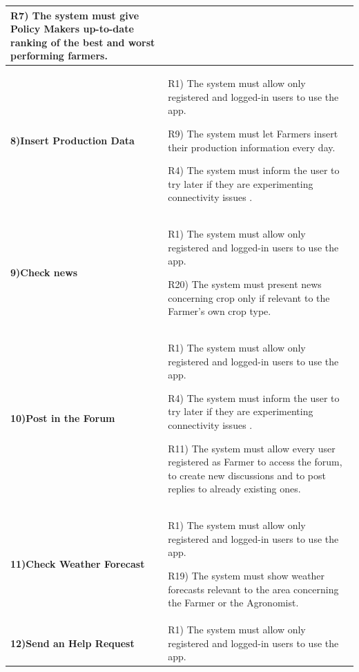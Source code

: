 \documentclass[table, 12pt]{article}
\begin{document}
\begin{itemize}
\begin{longtable}{|p{}|p{}|}
                                                                                           R7) The system must give Policy Makers up-to-date ranking of the best and worst performing farmers.\\\hline
                                
                    \cellcolor{SpringGreen!50}\textbf{8)Insert Production Data}\centering & R1) The system must allow only registered and logged-in users to use the app.

                                                                                  R9) The system must let Farmers insert their production information every day.
                                                                                  
                                                                                  R4) The system must inform the user to try later if they are experimenting connectivity issues .\\\hline
                    \cellcolor{SpringGreen!50}\textbf{9)Check news}\centering &  R1) The system must allow only registered and logged-in users to use the app.
                                                                       
                                                                                 R20) The system must present news concerning crop only if relevant to the Farmer's own crop type.\\\hline
                    \cellcolor{SpringGreen!50}\textbf{10)Post in the Forum}\centering &  R1) The system must allow only registered and logged-in users to use the app.
                    
                                                                               R4) The system must inform the user to try later if they are experimenting connectivity issues .
                                                                               
                                                                               R11) The system must allow every user registered as Farmer to access the forum, to create new discussions and to post replies to already existing ones.\\\hline
                    \cellcolor{SpringGreen!50}\textbf{11)Check Weather Forecast}\centering &  R1) The system must allow only registered and logged-in users to use the app.
                    
                                                                                    R19) The system must show weather forecasts relevant to the area concerning the Farmer or the Agronomist.\\\hline
                    \cellcolor{SpringGreen!50}\textbf{12)Send an Help Request}\centering &  R1) The system must allow only registered and logged-in users to use the app.


\end{longtable}
\end{itemize}
\end{document}
